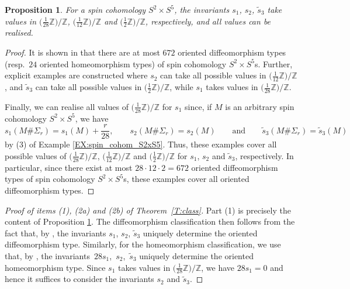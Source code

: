 \documentclass[pdftex]{sigma}
\numberwithin{equation}{section}
\newtheorem{Proposition}[Theorem]{Proposition}
\theoremstyle{definition}
\numberwithin{table}{section}
\newcommand{\Z}{\mathbb{Z}}
\begin{document}
\begin{Proposition}\label{P:s_i_values}
	For a spin cohomology $S^2\times S^5$, the invariants $s_1$, $s_2$, $\tilde{s}_3$ take values in $\bigl(\frac{1}{28}\Z\bigr)/\Z$, $\bigl(\frac{1}{12}\Z\bigr)/\Z$ and $\bigl(\frac{1}{2}\Z\bigr)/\Z$, respectively, and all values can be realised. %
\end{Proposition}
\begin{proof}
	It is shown in \cite[Section 5]{Wa22} that there are at most $672$ oriented diffeomorphism types (resp.\ $24$ oriented homeomorphism types) of spin cohomology $S^2\times S^5$s. Further, explicit examples are constructed where $s_2$ can take all possible values in $\bigl(\frac{1}{12}\Z\bigr)/\Z$, and $\tilde{s}_3$ can take all possible values in $\bigl(\frac{1}{2}\Z\bigr)/\Z$, while $s_1$ takes values in $\bigl(\frac{1}{28}\Z\bigr)/\Z$.
	
	Finally, we can realise all values of $\bigl(\frac{1}{28}\Z\bigr)/\Z$ for $s_1$ since, if $M$ is an arbitrary spin cohomology $S^2\times S^5$, we have
	\[ s_1(M\#\Sigma_r)=s_1(M)+\frac{r}{28}, \qquad s_2(M\#\Sigma_r)=s_2(M)\qquad  \text{and}\qquad \tilde{s}_3(M\#\Sigma_r)=\tilde{s}_3(M) \]
	by (3) of Example \ref{EX:spin_cohom_S2xS5}. Thus, these examples cover all possible values of $\bigl(\frac{1}{28}\Z\bigr)/\Z$, $\bigl(\frac{1}{12}\Z\bigr)/\Z$ and $\bigl(\frac{1}{2}\Z\bigr)/\Z$ for $s_1$, $s_2$ and $\tilde{s}_3$, respectively. In particular, since there exist at most $28\cdot 12\cdot 2=672$ oriented diffeomorphism types of spin cohomology $S^2\times S^5$s, these examples cover all oriented diffeomorphism types.
\end{proof}

\begin{proof}[Proof of items (1), (2a) and (2b) of Theorem~\ref{T:class}]
	Part (1) is precisely the content of Proposition \ref{P:s_i_values}. The diffeomorphism classification then follows from the fact that, by \cite[Theorem 1]{KS98}, the invariants $s_1$, $s_2$, $\tilde{s}_3$ uniquely determine the oriented diffeomorphism type. Similarly, for the homeomorphism classification, we use that, by \cite[Theorem 1]{KS98}, the invariants~$28s_1$,~$s_2$,~$\tilde{s}_3$ uniquely determine the oriented homeomorphism type. Since $s_1$ takes values in $\bigl(\frac{1}{28}\Z\bigr)/\Z$, we have $28s_1=0$ and hence it suffices to consider the invariants $s_2$ and $\tilde{s}_3$.
\end{proof}
\end{document}
